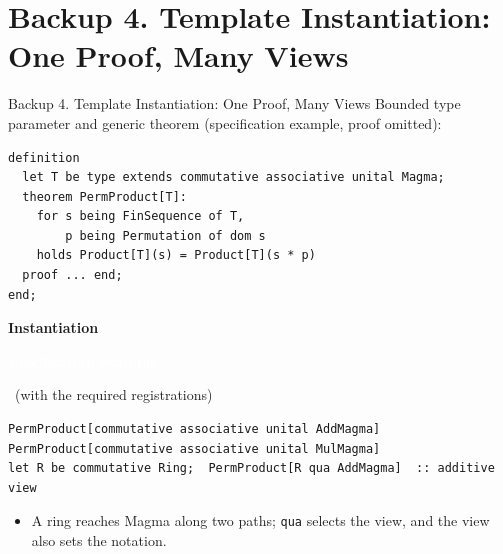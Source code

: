 \documentclass[aspectratio=169,11pt]{beamer}
\newcommand{\statusbadge}[2]{\colorbox{#1}{\textcolor{white}{\strut\scriptsize\sffamily\bfseries #2}}}
\newcommand{\badgeSpec}{\statusbadge{green!35!black}{specification example}}
\begin{document}
\section{Backup 4. Template Instantiation: One Proof, Many Views}
\begin{frame}[fragile,t]{Backup 4. Template Instantiation: One Proof, Many Views}
Bounded type parameter and generic theorem (specification example, proof omitted):

\begin{lstlisting}[language={mizar},basicstyle=\ttfamily\footnotesize]
definition
  let T be type extends commutative associative unital Magma;
  theorem PermProduct[T]:
    for s being FinSequence of T,
        p being Permutation of dom s
    holds Product[T](s) = Product[T](s * p)
  proof ... end;
end;
\end{lstlisting}
\smallskip
\textbf{Instantiation}~\badgeSpec~{\footnotesize(with the required registrations)}
\begin{lstlisting}[language={mizar},basicstyle=\ttfamily\small]
PermProduct[commutative associative unital AddMagma]
PermProduct[commutative associative unital MulMagma]
let R be commutative Ring;  PermProduct[R qua AddMagma]  :: additive view
\end{lstlisting}
\begin{itemize}
\setlength{\itemsep}{1pt}
\setlength{\parsep}{0pt}
\setlength{\parskip}{0pt}
\item A ring reaches Magma along two paths; \texttt{qua} selects the view, and the view also sets the notation.
\end{itemize}
\end{frame}
\end{document}
